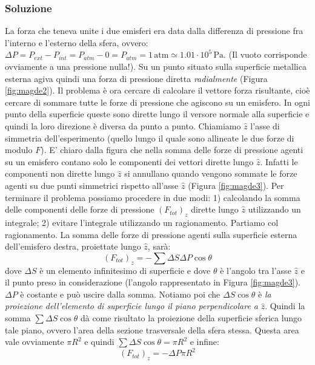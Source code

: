 \documentclass[12pt,a4paper]{book}
\begin{document}
\subsubsection*{Soluzione}
La forza che teneva unite i due emisferi era data dalla differenza di pressione fra l'interno e l'esterno della sfera, ovvero: $\Delta P=P_{ext}-P_{int}=P_{atm}-0=P_{atm}=1 \, \text{atm} \simeq 1.01 \cdot 10^{5} \, \text{Pa}$. (Il vuoto corrisponde ovviamente a una pressione nulla!).
Su un punto situato sulla superficie metallica esterna agiva quindi una forza di pressione diretta \textit{radialmente} (Figura \ref{fig:magde2}). Il problema è ora cercare di calcolare il vettore forza risultante, cioè cercare di sommare tutte le forze di pressione che agiscono su un emisfero.
In ogni punto della superficie queste sono dirette lungo il versore normale alla superficie e quindi la loro direzione è diversa da punto a punto. 
Chiamiamo $\hat{z}$ l'asse di simmetria dell'esperimento (quello lungo il quale sono allineate le due forze di modulo $F$). E' chiaro dalla figura che nella somma delle forze  di pressione agenti su un emisfero contano solo le componenti dei vettori dirette lungo $\hat{z}$. Infatti le componenti non dirette lungo $\hat{z}$ si annullano quando vengono sommate le forze agenti su due punti simmetrici rispetto all'asse $\hat{z}$ (Figura \ref{fig:magde3}). Per terminare il problema possiamo procedere in due modi: 1) calcolando la somma delle componenti delle forze di pressione $(F_{tot})_z$ dirette lungo $\hat{z}$ utilizzando un integrale; 2) evitare l'integrale utilizzando un ragionamento. Partiamo col ragionamento. 
La somma delle forze di pressione agenti sulla superficie esterna dell'emisfero destra, proiettate lungo $\hat{z}$, sarà: 
\begin{equation*}
(F_{tot})_z= - \sum \Delta S \Delta P \cos \theta
\end{equation*}
dove $\Delta S$ è un elemento infinitesimo di superficie e
dove $\theta$ è l'angolo tra l'asse $\hat{z}$ e il punto preso in considerazione (l'angolo rappresentato in Figura \ref{fig:magde3}). $\Delta P$ è costante e può uscire dalla somma. Notiamo poi che $ \Delta S  \cos \theta$ è \textit{la proiezione dell'elemento di superficie lungo il piano perpendicolare a} $\hat{z}$. 
Quindi la somma $\sum \Delta S  \cos \theta$ dà come risultato 
la proiezione della superficie sferica lungo tale piano, ovvero 
l'area della sezione trasversale della sfera stessa. Questa area vale ovviamente $\pi R^2$ e quindi $\sum \Delta S  \cos \theta=\pi R^2$ e infine:
\begin{equation*}
(F_{tot})_z= - \Delta P \pi R^2
\end{equation*}
\end{document}
